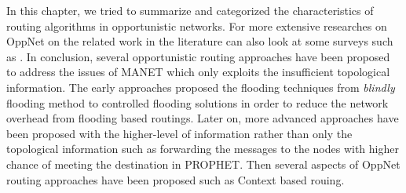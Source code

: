 In this chapter, we tried to summarize and categorized the characteristics of routing algorithms in opportunistic networks.
For more extensive researches on OppNet on the related work in the literature can also look at some surveys such as \cite{Yue2013, Souza2010, Poonguzharselvi2013a, Nousiainen2013, Behrouz2013, Wahid2014}.
In conclusion, several opportunistic routing approaches have been proposed to address the issues of MANET which only exploits the insufficient topological information.
The early approaches proposed the flooding techniques from \emph{blindly} flooding method to controlled flooding solutions in order to reduce the network overhead from flooding based routings.
Later on, more advanced approaches have been proposed with the higher-level of information rather than only the topological information such as forwarding the messages to the nodes with higher chance of meeting the destination in PROPHET.
Then several aspects of OppNet routing approaches have been proposed such as Context based rouing.


